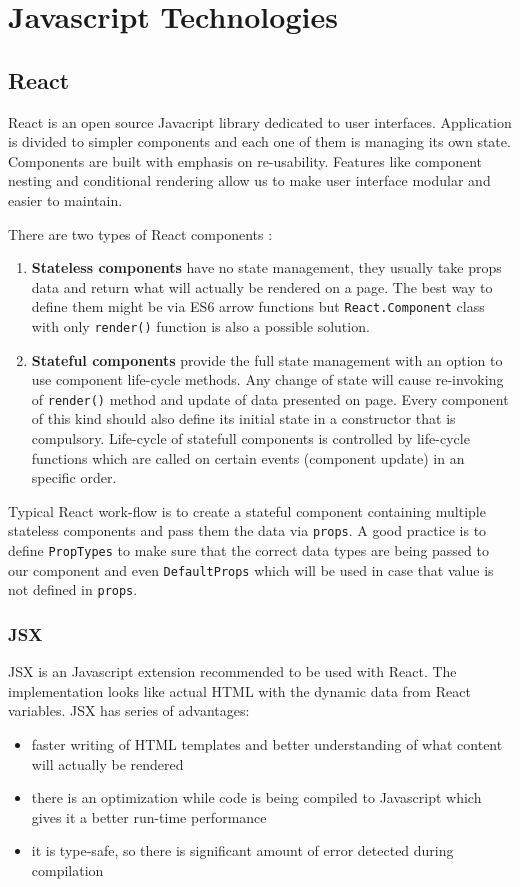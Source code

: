 \chapter{Javascript Technologies}

\section{React}
React is an open source Javacript library dedicated to user interfaces. Application is divided to simpler components and each one of them is managing its own state. Components are built with emphasis on re-usability. Features like component nesting and conditional rendering \cite{conditional} allow us to make user interface modular and easier to maintain.

There are two types of React components \cite{React}:
\begin{enumerate}
\item \textbf{Stateless components} have no state management, they usually take props data and return what will actually be rendered on a page. The best way to define them might be via ES6 arrow functions \cite{arrowFunctions} but \texttt{React.Component} class with only \texttt{render()} function is also a possible solution.

\item \textbf{Stateful components} provide the full state management with an option to use component life-cycle methods. Any change of state will cause re-invoking of \texttt{render()} method and update of data presented on page. Every component of this kind should also define its initial state in a constructor that is compulsory.
Life-cycle of statefull components is controlled by life-cycle functions which are called on certain events (component update) in an specific order.
\end{enumerate}

Typical React work-flow is to create a stateful component containing multiple stateless components and pass them the data via \texttt{props}. A good practice is to define \texttt{PropTypes} to make sure that the correct data types are being passed to our component and even \texttt{DefaultProps} which will be used in case that value is not defined in \texttt{props}. 

\subsection{JSX} 
JSX \cite{JSX} is an Javascript extension recommended to be used with React. The implementation looks like actual HTML with the dynamic data from React variables. JSX has series of advantages:
\begin{itemize}
\item faster writing of HTML templates and better understanding of what content will actually be rendered
\item there is an optimization while code is being compiled to Javascript which gives it a better run-time performance
\item it is type-safe, so there is significant amount of error detected during compilation
\end{itemize}  

